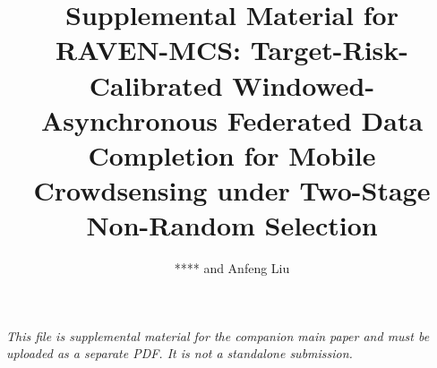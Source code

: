 \documentclass[letterpaper,journal]{IEEEtran}
\begin{document}
\title{Supplemental Material for\\
RAVEN-MCS: Target-Risk-Calibrated Windowed-Asynchronous Federated Data Completion for Mobile Crowdsensing under Two-Stage Non-Random Selection}

\author{**** and Anfeng Liu}

\maketitle

\noindent\textit{This file is supplemental material for the companion main paper
and must be uploaded as a separate PDF. It is not a standalone submission.}

\setcounter{figure}{5}
\setcounter{table}{5}
\setcounter{equation}{50}


\end{document}
